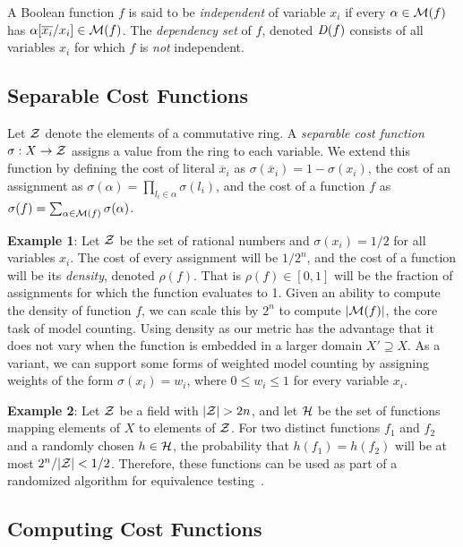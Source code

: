 \documentclass{llncs}
\newcommand{\obar}[1]{\overline{#1}}
\newcommand{\interp}{\alpha}
\newcommand{\interpset}[1]{{\cal M}(#1)}
\newcommand{\ring}{{\cal Z}}
\newcommand{\cost}{\sigma}
\newcommand{\density}{\rho}
\newcommand{\hashset}{{\cal H}}
\newcommand{\fhash}{h}
\newcommand{\depend}{{\it D}}
\newcommand{\subs}[2]{[#2/#1]}
\newcommand{\subsflip}[1]{\subs{#1}{\obar{#1}}}
\begin{document}
A Boolean function $f$ is said to be {\em independent} of variable
$x_i$ if every $\interp \in \interpset{f}$ has $\interp\subsflip{x_i}
\in \interpset{f}$.  The {\em dependency set} of $f$, denoted
$\depend(f)$ consists of all variables $x_i$ for which $f$ is {\em
  not} independent.

\subsection{Separable Cost Functions}

Let $\ring$ denote the elements of a commutative ring.  A {\em
  separable cost function} $\cost:X \rightarrow \ring$ assigns a value
from the ring to each variable.  We extend this function by defining
the cost of literal $\obar{x}_i$ as $\cost(\obar{x}_i) = 1 - \cost(x_i)$, the cost
of an assignment as $\cost(\interp) = \prod_{l_i \in \interp}
\cost(l_i)$, and the cost of a function $f$ as $\cost(f) =
\sum_{\interp \in \interpset{f}} \cost(\interp)$.

{\bf Example 1}: Let $\ring$ be the set of rational numbers and
$\cost(x_i) = 1/2$ for all variables $x_i$.  The cost of every
assignment will be $1/2^{n}$, and the cost of a function will be its
{\em density}, denoted $\density(f)$.  That is $\density(f) \in [0,
  1]$ will be the fraction of assignments for which the function
evaluates to 1.  Given an ability to compute the density of
function $f$, we can scale this by $2^n$ to compute $|\interpset{f}|$, the core task of model counting.
Using density as our metric has the advantage that it
does not vary when the function is embedded in a larger domain $X'
\supseteq X$.  As a variant, we can support some forms of
weighted model counting by assigning weights of the form
$\cost(x_i) = w_i$, where $0 \leq w_i \leq 1$ for every variable $x_i$.

{\bf Example 2}: Let $\ring$ be a field with $|\ring| > 2n$,
and let $\hashset$ be the set of functions
mapping elements of $X$ to elements of $\ring$.  For
two distinct functions $f_1$ and $f_2$ and a randomly chosen $\fhash
\in \hashset$, the probability that $h(f_1) = h(f_2)$ will be at most
$2^n/|\ring|< 1/2$.  Therefore, these functions can be used as part of a
randomized algorithm for equivalence testing~\cite{blum:ipl:1980}.

\subsection{Computing Cost Functions}
\end{document}
